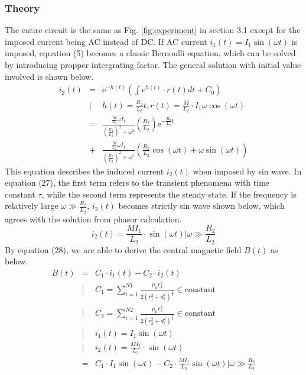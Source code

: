 \subsubsection{Theory}
The entire circuit is the same as Fig. \ref{fig:experiment} in section 3.1 except for the imposed current being AC instead of DC.
If AC current $i_1(t) = I_1\sin(\omega t)$ is imposed, equation (5) becomes a classic Bernoulli equation,
which can be solved by introducing propper intergrating factor.
The general solution with initial value involved is shown below.
\begin{eqnarray}
  i_2(t) &=& \mathrm{e}^{-h(t)}\left( \int \mathrm{e}^{h(t)}\cdot r(t)dt + C_0 \right)\nonumber\\
  &|& h(t) = \frac{R_2}{L_2}t, r(t) = \frac{M}{L_2}\cdot I_1\omega\cos(\omega t) \nonumber\\
  &=& \frac{\frac{M}{L_2}\omega I_1}{(\frac{R_2}{L_2})^2+\omega^2}\left(\frac{R_2}{L_2}\right)\mathrm{e}^{-\frac{R_2}{L_2}t} \nonumber\\
  &+& \frac{\frac{M}{L_2}\omega I_1}{(\frac{R_2}{L_2})^2+\omega^2}\left(\frac{R_2}{L_2}\cos(\omega t) + \omega\sin(\omega t)\right)
\end{eqnarray}
This equation describes the induced current $i_2(t)$ when imposed by sin wave.
In equation (27), the first term refers to the transient phenomena with time constant $\tau$,
while the second term represents the steady state.
If the frequency is relatively large $\omega \gg \frac{R_2}{L_2}$,
$i_2(t)$ becomes strictly sin wave shown below,
which agrees with the solution from phasor calculation.
\begin{equation}
  i_2(t) = \frac{MI_1}{L_2}\cdot\sin(\omega t) |\omega \gg \frac{R_2}{L_2}
\end{equation}
By equation (28), we are able to derive the central magnetic field $B(t)$ as below.
\begin{eqnarray}
  B(t) &=& C_1\cdot i_1(t) - C_2\cdot i_2(t)\nonumber\\
  &|& C_1 = \sum_{i=1}^{N1} \frac{\mu_0r_1^2}{2\left(r_1^2 + d_i^2\right)^{\frac{3}{2}}} \in \mathrm{constant}\nonumber\\
  &|& C_2 = \sum_{i=1}^{N2} \frac{\mu_0r_2^2}{2\left(r_2^2 + d_i^2\right)^{\frac{3}{2}}} \in \mathrm{constant}\nonumber\\
  &|& i_1(t) = I_1\sin(\omega t)\nonumber\\
  &|& i_2(t) = \frac{MI_1}{L_2}\cdot\sin(\omega t)\nonumber\\
  &=& C_1\cdot I_1\sin(\omega t) - C_2\cdot\frac{MI_1}{L_2}\sin(\omega t)|\omega \gg \frac{R_2}{L_2}
\end{eqnarray}
